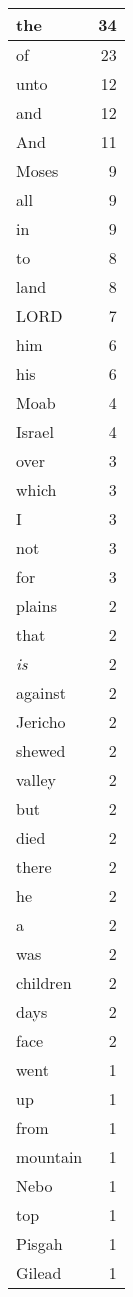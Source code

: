\begin{center}
\begin{longtable}{l|r}
\hline \hline
\endlastfoot
the & 34 \\ \hline
of & 23 \\ \hline
unto & 12 \\ \hline
and & 12 \\ \hline
And & 11 \\ \hline
Moses & 9 \\ \hline
all & 9 \\ \hline
in & 9 \\ \hline
to & 8 \\ \hline
land & 8 \\ \hline
LORD & 7 \\ \hline
him & 6 \\ \hline
his & 6 \\ \hline
Moab & 4 \\ \hline
Israel & 4 \\ \hline
over & 3 \\ \hline
which & 3 \\ \hline
I & 3 \\ \hline
not & 3 \\ \hline
for & 3 \\ \hline
plains & 2 \\ \hline
that & 2 \\ \hline
\emph{is} & 2 \\ \hline
against & 2 \\ \hline
Jericho & 2 \\ \hline
shewed & 2 \\ \hline
valley & 2 \\ \hline
but & 2 \\ \hline
died & 2 \\ \hline
there & 2 \\ \hline
he & 2 \\ \hline
a & 2 \\ \hline
was & 2 \\ \hline
children & 2 \\ \hline
days & 2 \\ \hline
face & 2 \\ \hline
went & 1 \\ \hline
up & 1 \\ \hline
from & 1 \\ \hline
mountain & 1 \\ \hline
Nebo & 1 \\ \hline
top & 1 \\ \hline
Pisgah & 1 \\ \hline
Gilead & 1 \\ \hline

\end{longtable}
\end{center}
